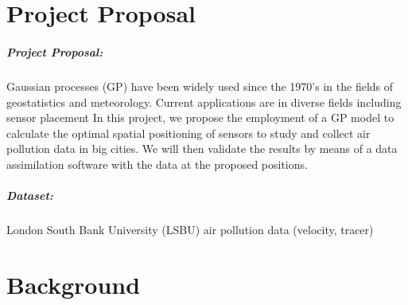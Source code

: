\documentclass[12pt,twoside]{report}
\date{June 2019}
\begin{document}



\clearpage{\pagestyle{empty}\cleardoublepage}
\setcounter{page}{1}
\pagestyle{fancy}


\cleardoublepage

\clearpage{\pagestyle{empty}\cleardoublepage}

\tableofcontents 


\clearpage{\pagestyle{empty}\cleardoublepage}
\setcounter{page}{1}
\fancyhead[LE,RO]{\slshape \rightmark}
\fancyhead[LO,RE]{\slshape \leftmark}

\chapter{Project Proposal}


\paragraph{Project Proposal:}
Gaussian processes (GP) have been widely used since the 1970’s in the fields of geostatistics and meteorology. Current applications are in diverse fields including sensor placement
In this project, we propose the employment of a GP model to calculate the optimal spatial positioning of sensors to study and collect air pollution data in big cities. We will then validate the results by means of a data assimilation software with the data at the proposed positions.

\paragraph{Dataset:} London South Bank University (LSBU) air pollution data (velocity, tracer)



 
\chapter{Background}
\end{document}
